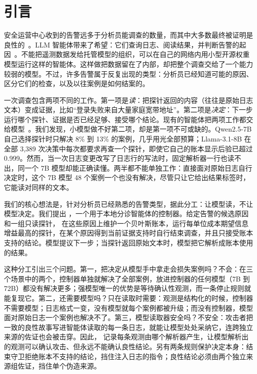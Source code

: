 \section{引言}
\label{sec:intro}

安全运营中心收到的告警远多于分析员能调查的数量，而其中大多数最终被证明是良性的~\citep{nodoze}。LLM 智能体带来了希望：它们查询日志、阅读结果，并判断告警的起因~\citep{excytin,clouseau}。不能把遥测数据发给托管模型的组织，可以在自己的网络内用小型开源权重模型运行这样的智能体。这样做把数据留在了内部，却把整个调查交给了一个能力较弱的模型。不过，许多告警属于反复出现的类型：分析员已经知道可能的原因、区分它们的检查，以及以往案例是如何结案的。

一次调查包含两项不同的工作。第一项是\emph{读}：把探针返回的内容（往往是原始日志文本）变成证据，比如“登录失败来自大量家庭宽带地址”。第二项是\emph{决定}：下一步运行哪个探针、证据是否已经足够、接受哪个结论。现有的智能体把两项工作都交给模型~\citep{react}。我们发现，小模型做不好第二项，却是第一项不可或缺的。Qwen2.5-7B 自己选择探针时只解决 8\% 到 13\% 的案例，几乎用光全部预算；Llama-3.1-8B 在全部 3{,}389 次决策中每次都要求再查一个探针，即使它自己的账本显示后验已超过 0.999。然而，当一次日志变更改写了日志行的写法时，固定解析器一行也读不出，同一个 7B 模型却能正确读懂。两半都不能单独工作：直接面对原始日志自行决定时，这个 7B 模型 48 个案例一个也没有解决，尽管只让它给出结果标签时，它能读对同样的文本。

我们的核心想法是，针对分析员已经熟悉的告警类型，据此分工：让模型读，不让模型决定。我们提出 \hesp{}，一个用于本地分诊智能体的控制器。给定告警的候选原因和一组只读探针，\hesp{} 在这些原因上维护一个贝叶斯账本，运行每单位成本期望信息增益最高的探针，在某个原因得到当前证据支持时自行结束调查，并且只接受账本支持的结论。模型提议下一步；当探针返回原始文本时，模型把它解析成账本使用的结果。

这种分工引出三个问题。第一，把决定从模型手中拿走会损失案例吗？不会：在三个场景中的两个，控制器单独就解决了全部案例，放进控制器的任何模型（7B 到 72B）都没有解决更多；强模型唯一的优势是等待确认性观测，而一条停止规则就能复现它。第二，还需要模型吗？只在读取时需要：观测是结构化的时候，控制器不需要模型；日志格式一变，没有模型就每个案例都被升级；而没有控制器，模型面对原始日志一个案例也解决不了。第三，模型读取器安全吗？不安全：攻击者把一致的良性故事写进智能体读取的每一条日志，就能让模型处处采纳它，连跨独立来源的佐证也会被击穿。因此，\hesp{} 记录每条观测由哪个解析器产生，让模型解析出的观测可以确认攻击、但永远不能确认良性结论。另有两条规则保护决定本身：结束守卫拒绝账本不支持的结论，挡住注入日志的指令；良性结论必须由两个独立来源组佐证，挡住单个伪造来源。

